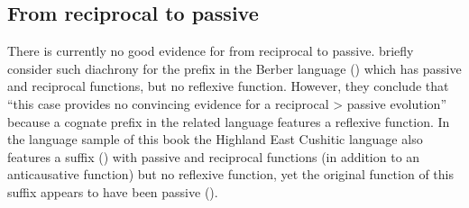 \subsection{From reciprocal to passive} \label{diachrony:recp2pass}
There is currently no good evidence for  from reciprocal to passive. \citet[206]{heine:miyashita:2008} briefly consider such diachrony for the prefix  in the Berber language  () which has passive and reciprocal functions, but no reflexive function. However, they conclude that “this case provides no convincing evidence for a reciprocal > passive evolution” because a cognate prefix in the related language  features a reflexive function. In the language sample of this book the Highland East Cushitic language  also features a suffix () with passive and reciprocal functions (in addition to an anticausative function) but no reflexive function, yet the original function of this suffix appears to have been passive (). 

